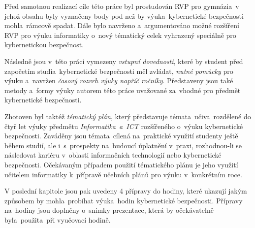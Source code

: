 \documentclass[a4paper, 12pt]{article}
\begin{document}
Před samotnou realizací cíle této práce byl prostudován RVP pro gymnázia~v jehož obsahu byly vyznačeny body pod než by výuka~kybernetické bezpečnosti mohla~rámcově spadat. Dále bylo navrženo a~argumentováno možné rozšíření RVP pro výuku informatiky o~nový tématický celek vyhrazený speciálně pro kybernetickou bezpečnost.

Následně jsou v~této práci vymezeny \textit{vstupní dovednosti}, které by student před započetím studia~kybernetické bezpečnosti měl zvládat, \textit{nutné pomůcky} pro výuku a~navržen \textit{časový rozvrh výuky napříč ročníky}. Představeny jsou také metody a~formy výuky autorem této práce uvažované za~vhodné pro předmět kybernetické bezpečnosti.

Zhotoven byl taktéž \textit{tématický plán}, který představuje témata~učiva~rozdělené do čtyř let výuky předmětu \textit{Informatika~a~ICT} rozšířeného o~výuku kybernetické bezpečnosti. Zaváděny jsou témata~cílená na~praktické využití studenty ještě během studií, ale i~s~prospekty na~budoucí úplatnění v~praxi, rozhodnou-li se následovat kariéru v~oblasti informačních technologií nebo kybernetické bezpečnosti. Očekávaným případem použití tématického plánu je jeho využití učitelem informatiky k~přípravě učebních plánů pro výuku v~konkrétním roce.

V poslední kapitole jsou pak uvedeny 4 přípravy do hodiny, které ukazují jakým způsobem by mohla~probíhat výuka~hodin kybernetické bezpečnosti. Přípravy na~hodiny jsou doplněny o~snímky prezentace, která by očekávatelně byla~použita~při vyučovací hodině.
\end{document}
